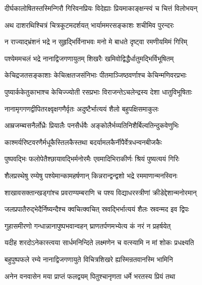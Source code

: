 
\twolineshloka
{दीर्घकालोषितस्तस्मिन्गिरौ गिरिवनप्रियः}
{विदेह्याः प्रियमाकाङ्क्षन्स्वं च चित्तं विलोभयन्} %

\twolineshloka
{अथ दाशरथिश्चित्रं चित्रकूटमदर्शयत्}
{भार्याममरसङ्काशः शचीमिव पुरन्दरः} %

\twolineshloka
{न राज्याद्भ्रंशनं भद्रे न सुहृद्भिर्विनाभवः}
{मनो मे बाधते दृष्ट्वा रमणीयमिमं गिरिम्} %

\twolineshloka
{पश्येममचलं भद्रे नानाद्विजगणायुतम्}
{शिखरैः खमिवोद्विद्धैर्धातुमद्भिर्विभूषितम्} %

\twolineshloka
{केचिद्रजतसङ्काशाः केचित्क्षतजसंनिभाः}
{पीतमाञ्जिष्ठवर्णाश्च केचिन्मणिवरप्रभाः} %

\twolineshloka
{पुष्यार्ककेतुकाभाश्च केचिज्ज्योती रसप्रभाः}
{विराजन्तेऽचलेन्द्रस्य देशा धातुविभूषिताः} %

\twolineshloka
{नानामृगगणद्वीपितरक्ष्वृक्षगणैर्वृतः}
{अदुष्टैर्भात्ययं शैलो बहुपक्षिसमाकुलः} %

\twolineshloka
{आम्रजम्ब्वसनैर्लोध्रैः प्रियालैः पनसैर्धवैः}
{अङ्कोलैर्भव्यतिनिशैर्बिल्वतिन्दुकवेणुभिः} %

\twolineshloka
{काश्मर्यरिष्टवरणैर्मधूकैस्तिलकैस्तथा}
{बदर्यामलकैर्नीपैर्वेत्रधन्वनबीजकैः} %

\twolineshloka
{पुष्पवद्भिः फलोपेतैश्छायावद्भिर्मनोरमैः}
{एवमादिभिराकीर्णः श्रियं पुष्यत्ययं गिरिः} %

\twolineshloka
{शैलप्रस्थेषु रम्येषु पश्येमान्कामहर्षणान्}
{किन्नरान्द्वन्द्वशो भद्रे रममाणान्मनस्विनः} %

\twolineshloka
{शाखावसक्तान्खड्गांश्च प्रवराण्यम्बराणि च}
{पश्य विद्याधरस्त्रीणां क्रीडेद्देशान्मनोरमान्} %

\twolineshloka
{जलप्रपातैरुद्भेदैर्निष्यन्दैश्च क्वचित्क्वचित्}
{स्रवद्भिर्भात्ययं शैलः स्रवन्मद इव द्विपः} %

\twolineshloka
{गुहासमीरणो गन्धान्नानापुष्पभवान्वहन्}
{घ्राणतर्पणमभ्येत्य कं नरं न प्रहर्षयेत्} %

\twolineshloka
{यदीह शरदोऽनेकास्त्वया सार्धमनिन्दिते}
{लक्ष्मणेन च वत्स्यामि न मां शोकः प्रधक्ष्यति} %

\twolineshloka
{बहुपुष्पफले रम्ये नानाद्विजगणायुते}
{विचित्रशिखरे ह्यस्मिन्रतवानस्मि भामिनि} %

\twolineshloka
{अनेन वनवासेन मया प्राप्तं फलद्वयम्}
{पितुश्चानृणता धर्मे भरतस्य प्रियं तथा} %

